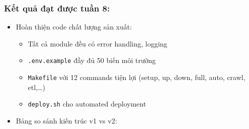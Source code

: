 \hypertarget{kux1ebft-quux1ea3-ux111ux1ea1t-ux111ux1b0ux1ee3c-tuux1ea7n-8}{%
\subsubsection{Kết quả đạt được tuần
8:}}

\begin{itemize}
\item
  Hoàn thiện code chất lượng sản xuất:

  \begin{itemize}
  \tightlist
  \item
    Tất cả module đều có error handling, logging
  \item
    \texttt{.env.example} đầy đủ 50 biến môi trường
  \item
    \texttt{Makefile} với 12 commands tiện lợi (setup, up, down, full,
    auto, crawl, etl,\ldots)
  \item
    \texttt{deploy.sh} cho automated deployment
  \end{itemize}
\item
  Bảng so sánh kiến trúc v1 vs v2:


\end{itemize}
